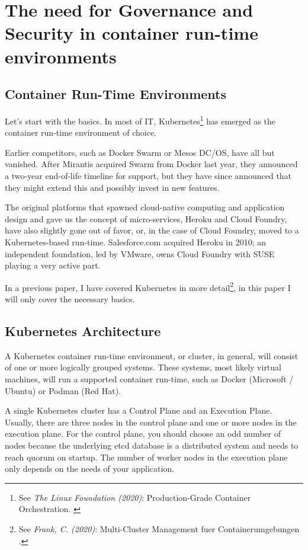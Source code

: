 %
%

\pagebreak
\section{The need for Governance and Security in container run-time environments}

\onehalfspacing

\subsection{Container Run-Time Environments}

Let's start with the basics. In most of IT, Kubernetes\footnote{See \textit{The Linux Foundation (2020)}: Production-Grade Container Orchestration. \cite{kubernetes}} has emerged as the container run-time environment of choice.

Earlier competitors, such as Docker Swarm or Mesos DC/OS, have all but vanished. After Mirantis acquired Swarm from Docker last year, they announced a two-year end-of-life timeline for support, but they have since announced that they might extend this and possibly invest in new features.

The original platforms that spawned cloud-native computing and application design and gave us the concept of micro-services, Heroku and Cloud Foundry, have also slightly gone out of favor, or, in the case of Cloud Foundry, moved to a Kubernetes-based run-time. Salesforce.com acquired Heroku in 2010; an independent foundation, led by VMware, owns Cloud Foundry with SUSE playing a very active part.

In a previous paper, I have covered Kubernetes in more detail\footnote{See \textit{Frank, C. (2020)}: Multi-Cluster Management fuer Containerumgebungen .\cite{previousPaper}}, in this paper I will only cover the necessary basics.

\subsection{Kubernetes Architecture}

A Kubernetes container run-time environment, or cluster, in general, will consist of one or more logically grouped systems. These systems, most likely virtual machines, will run a supported container run-time, such as Docker (Microsoft / Ubuntu) or Podman (Red Hat).

A single Kubernetes cluster has a Control Plane and an Execution Plane. Usually, there are three nodes in the control plane and one or more nodes in the execution plane. For the control plane, you should choose an odd number of nodes because the underlying etcd database is a distributed system and needs to reach quorum on startup. The number of worker nodes in the execution plane only depends on the needs of your application.

